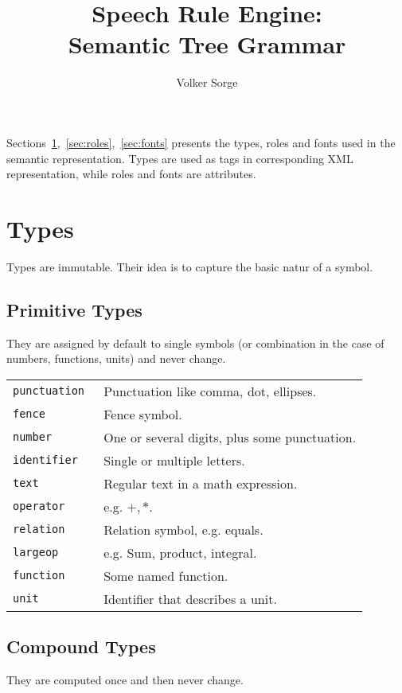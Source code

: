 \documentclass{article}
\title{Speech Rule Engine:\\ Semantic Tree Grammar}
\author{Volker Sorge}
\begin{document}
\maketitle

Sections~\ref{sec:types},~\ref{sec:roles},~\ref{sec:fonts} presents the types,
roles and fonts used in the semantic representation. Types are used as tags in
corresponding XML representation, while roles and fonts are attributes.

\section{Types}
\label{sec:types}

Types are immutable. Their idea is to capture the basic natur of a symbol.

\subsection{Primitive Types}
\label{sec:primitive types}

They are assigned by default to single symbols (or combination in the case of
numbers, functions, units) and never change.

\begin{tabular}{>{\tt}ll}
  punctuation & Punctuation like comma, dot, ellipses.\\
  fence & Fence symbol.\\
  number & One or several digits, plus some punctuation.\\
  identifier & Single or multiple letters.\\
  text & Regular text in a math expression.\\
  operator & e.g. $+, *$.\\
  relation & Relation symbol, e.g. equals.\\
  largeop & e.g. Sum, product, integral.\\
  function & Some named function.\\
  unit & Identifier that describes a unit.
\end{tabular}

\subsection{Compound Types}
\label{sec:compound types}

They are computed once and then never change.
\end{document}

